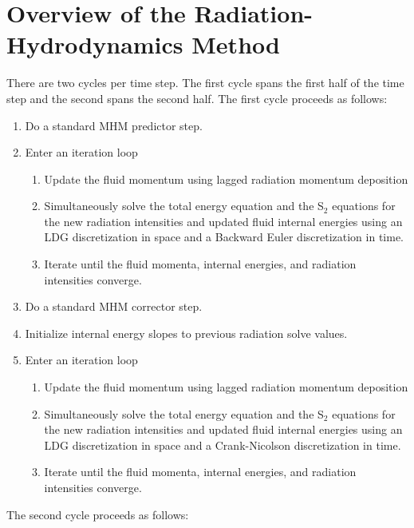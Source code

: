 \documentclass[preprint,12pt]{elsarticle}
\begin{document}
\section{Overview of the Radiation-Hydrodynamics Method}
\label{sec:Method}

There are two cycles per time step.  The first cycle spans the first half of the time step and the second 
spans the second half.  The first cycle proceeds as follows:
\begin{enumerate}
  \item Do a standard MHM predictor step. 
  \item Enter an iteration loop
  \begin{enumerate}
    \item Update the fluid momentum using lagged radiation momentum deposition
    \item Simultaneously solve the total energy equation and the S$_2$ equations for the new radiation intensities and updated fluid internal energies 
		using an LDG discretization in space and a Backward Euler discretization in time.
    \item Iterate until the fluid momenta, internal energies, and radiation intensities converge.
  \end{enumerate}
  \item Do a standard MHM corrector step.
  \item Initialize internal energy slopes to previous radiation solve values.
  \item Enter an iteration loop
  \begin{enumerate}
    \item Update the fluid momentum using lagged radiation momentum deposition
    \item Simultaneously solve the total energy equation and the S$_2$ equations for the new radiation intensities and updated fluid internal energies 
		using an LDG discretization in space and a Crank-Nicolson discretization in time.
    \item Iterate until the fluid momenta, internal energies, and radiation intensities converge.
  \end{enumerate}
\end{enumerate}
The second cycle proceeds as follows:
\end{document}
